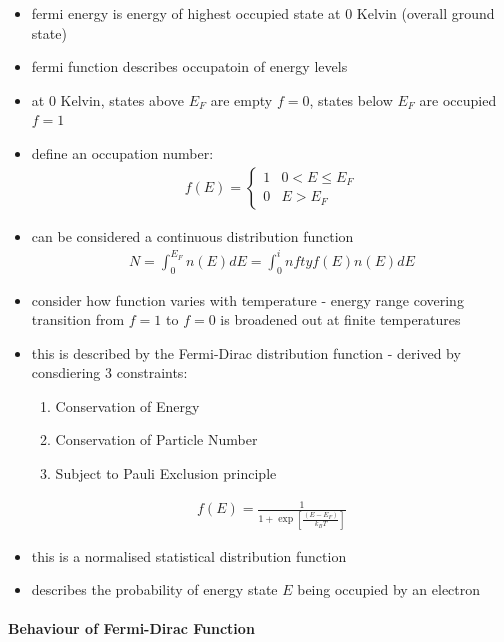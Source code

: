 \documentclass[a4paper,11pt,normalem]{article}
\begin{document}
\begin{itemize}
    \item fermi energy is energy of highest occupied state at 0 Kelvin (overall ground state)
    \item fermi function describes occupatoin of energy levels
    \item at 0 Kelvin, states above \(E_F\) are empty \(f=0\), states below \(E_F\) are occupied \(f=1\)
    \item define an occupation number:
        \begin{align*}
            f(E) = \begin{cases} 1 & 0 < E \leq E_F \\ 0 & E > E_F \end{cases}
        \end{align*}
    \item can be considered a continuous distribution function
        \begin{align*}
            N = \int_0^{E_F} n(E)dE = \int_0^infty f(E)n(E)dE
        \end{align*}
    \item consider how function varies with temperature - energy range covering transition from \(f=1\) to \(f=0\) is broadened out at finite temperatures
    \item this is described by the Fermi-Dirac distribution function - derived by consdiering 3 constraints:
        \begin{enumerate}
            \item Conservation of Energy
            \item Conservation of Particle Number
            \item Subject to Pauli Exclusion principle
        \end{enumerate}
        \begin{align*}
            f(E) = \frac{1}{1 + \exp\left[\frac{(E-E_F)}{k_BT}\right]}
        \end{align*}
    \item this is a normalised statistical distribution function
    \item describes the probability of energy state \(E\) being occupied by an electron
\end{itemize}

\paragraph{Behaviour of Fermi-Dirac Function}
\end{document}
